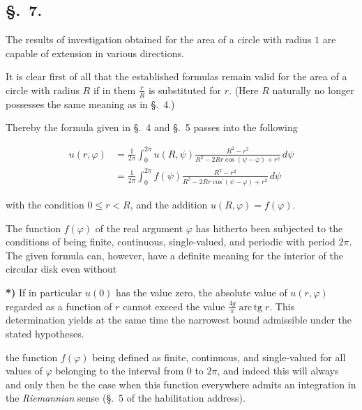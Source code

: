 \documentclass{article}
\begin{document}
\subsection*{§.~7.}



The results of investigation obtained for the area of a circle with radius $1$ are capable of extension in various directions.



It is clear first of all that the established formulas remain valid for the area of a circle with radius $R$ if in them $\frac{r}{R}$ is substituted for $r$. (Here $R$ naturally no longer possesses the same meaning as in §.~4.)



Thereby the formula given in §.~4 and §.~5 passes into the following

\[

\begin{aligned}

u(r, \varphi) &= \frac{1}{2\pi} \int_0^{2\pi} u(R, \psi) \frac{R^2 - r^2}{R^2 - 2Rr \cos(\psi - \varphi) + r^2}\,d\psi \\

&= \frac{1}{2\pi} \int_0^{2\pi} f(\psi) \frac{R^2 - r^2}{R^2 - 2Rr \cos(\psi - \varphi) + r^2}\,d\psi

\end{aligned}

\]

with the condition $0 \le r < R$, and the addition $u(R, \varphi) = f(\varphi)$.



The function $f(\varphi)$ of the real argument $\varphi$ has hitherto been subjected to the conditions of being finite, continuous, single-valued, and periodic with period $2\pi$. The given formula can, however, have a definite meaning for the interior of the circular disk even without







\textbf{*)} If in particular $u(0)$ has the value zero, the absolute value of $u(r, \varphi)$ regarded as a function of $r$ cannot exceed the value $\frac{4g}{\pi} \operatorname{arc\,tg} r$. This determination yields at the same time the narrowest bound admissible under the stated hypotheses.




the function $f(\varphi)$ being defined as finite, continuous, and single-valued for all values of $\varphi$ belonging to the interval from $0$ to $2\pi$, and indeed this will always and only then be the case when this function everywhere admits an integration in the \emph{Riemannian} sense (§.~5 of the habilitation address).
\end{document}
